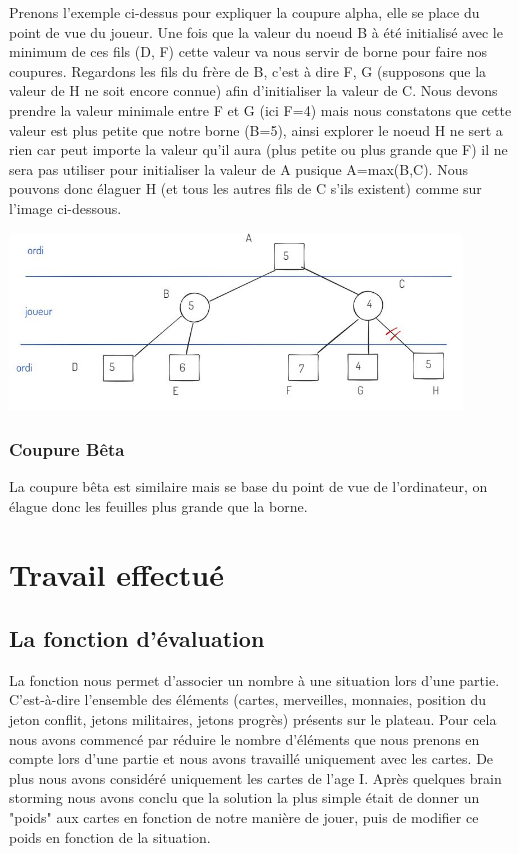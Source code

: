 \documentclass[a4paper, 12pt, french]{article}
\begin{document}
	Prenons l'exemple ci-dessus pour expliquer la coupure alpha, elle se place du point de vue du joueur.
	Une fois que la valeur du noeud B à été initialisé avec le minimum de ces fils (D, F) cette valeur va nous
	servir de borne pour faire nos coupures. Regardons les fils du frère de B, c'est à dire F, G (supposons que
	la valeur de H ne soit encore connue) afin d'initialiser la valeur de C. Nous devons prendre la valeur minimale
	entre F et G (ici F=4) mais nous constatons que cette valeur est plus petite que notre borne (B=5), ainsi explorer
	le noeud H ne sert a rien car peut importe la valeur qu'il aura (plus petite ou plus grande que F) il ne sera pas
	utiliser pour initialiser la valeur de A pusique A=max(B,C). Nous pouvons donc élaguer H (et tous les autres fils
	de C s'ils existent) comme sur l'image ci-dessous.

	\includegraphics[width=12cm]{images/elagageAlphaSuite.JPG}

	\subsubsection{Coupure Bêta}
	La coupure bêta est similaire mais se base du point de vue de l'ordinateur, on élague donc les
	feuilles plus grande que la borne\cite{wiki_7_wonder}.

	\section{Travail effectué}
	\subsection{La fonction d'évaluation}
	La fonction nous permet d'associer un nombre à une situation lors d'une partie. C'est-à-dire l'ensemble
	des éléments (cartes, merveilles, monnaies, position du jeton conflit, jetons militaires, jetons progrès)
	présents sur le plateau. Pour cela nous avons commencé par réduire le nombre d'éléments que nous prenons en
	compte lors d'une partie et nous avons travaillé uniquement avec les cartes. De plus nous avons considéré
	uniquement les cartes de l'age I. Après quelques brain storming nous avons conclu que la solution la
	plus simple était de donner un "poids" aux cartes en fonction de notre manière de jouer, puis de modifier ce poids
	en fonction de la situation.
\end{document}
